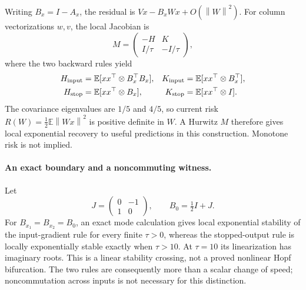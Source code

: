 \documentclass[11pt,a4paper]{article}
\newcommand{\E}{\mathbb{E}}
\newcommand{\norm}[1]{\left\lVert #1\right\rVert}
\begin{document}
Writing $B_x=I-A_x$, the residual is
$Vx-B_xWx+O(\norm{W}^2)$. For column vectorizations $w,v$, the local
Jacobian is
\begin{equation}
 M=\begin{pmatrix}-H&K\\I/\tau&-I/\tau\end{pmatrix},
 \label{eq:block}
\end{equation}
where the two backward rules yield
\begin{align}
 H_{\rm input}&=\E[xx^\top\otimes B_x^\top B_x],&
 K_{\rm input}&=\E[xx^\top\otimes B_x^\top],\nonumber\\
 H_{\rm stop}&=\E[xx^\top\otimes B_x],&
 K_{\rm stop}&=\E[xx^\top\otimes I].
 \label{eq:blocks}
\end{align}
The covariance eigenvalues are $1/5$ and $4/5$, so current risk
$R(W)=\tfrac12\E\norm{Wx}^2$ is positive definite in $W$.
A Hurwitz $M$ therefore gives local exponential recovery to useful
predictions in this construction. Monotone risk is not implied.

\paragraph{An exact boundary and a noncommuting witness.}
Let
\[
 J=\begin{pmatrix}0&-1\\1&0\end{pmatrix},\qquad B_0=\tfrac12 I+J.
\]
For $B_{x_1}=B_{x_2}=B_0$, an exact mode calculation gives local
exponential stability of the input-gradient rule for every finite
$\tau>0$, whereas the stopped-output rule is locally exponentially
stable exactly when $\tau>10$. At $\tau=10$ its linearization has
imaginary roots. This is a linear stability crossing, not a proved
nonlinear Hopf bifurcation. The two rules are consequently more than
a scalar change of speed; noncommutation across inputs is not necessary
for this distinction.
\end{document}
